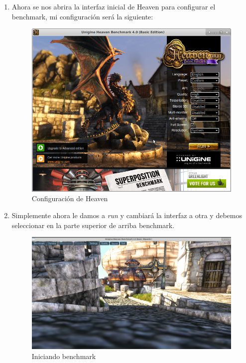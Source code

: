 \begin{enumerate}
	\item Ahora se nos abrira la interfaz inicial de Heaven para configurar el benchmark, mi configuración será la siguiente:
	
	\begin{figure}[H] %
		\centering
		\includegraphics[scale=0.3]{pics/heaven4}  %
		\caption{Configuración de Heaven} \label{fig:HEAVEN4}
	\end{figure}
	
	\item Simplemente ahora le damos a \textit{run} y cambiará la interfaz a otra y debemos seleccionar en la parte superior de arriba benchmark.
	
	\begin{figure}[H] %
		\centering
		\includegraphics[scale=0.3]{pics/heaven6}  %
		\caption{Iniciando benchmark} \label{fig:HEAVEN5}
	\end{figure}


\end{enumerate}
